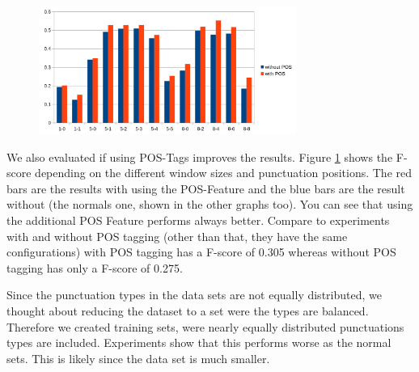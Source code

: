 \begin{figure}[ht]
    \centering
    \includegraphics[width=0.75\textwidth]{img/window_pos_eval.png}
    \caption{}
    \label{fig:window_pos_eval}
\end{figure}

We also evaluated if using POS-Tags improves the results. Figure \ref{fig:window_pos_eval} shows the F-score depending on the different window sizes and punctuation positions. The red bars are the results with using the POS-Feature and the blue bars are the result without (the normals one, shown in the other graphs too).
You can see that using the additional POS Feature performs always better.
Compare to experiments with and without POS tagging (other than that, they have the same configurations) with POS tagging has a F-score of 0.305 whereas without POS tagging has only a F-score of 0.275.

Since the punctuation types in the data sets are not equally distributed, we thought about reducing the dataset to a set were the types are balanced. Therefore we created training sets, were nearly equally distributed punctuations types are included. Experiments show that this performs worse as the normal sets. This is likely since the data set is much smaller.
